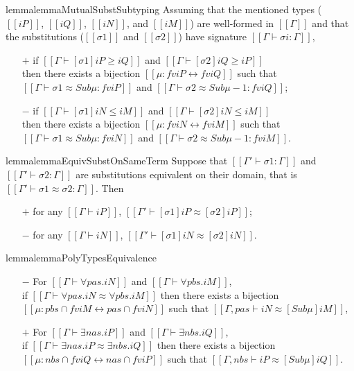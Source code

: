 \begin{restatable}{lemma}{lemmaMutualSubstSubtyping}
    \label{lemma:mutual-subst-subtyping}
    Assuming that the mentioned types ($[[iP]]$, $[[iQ]]$, $[[iN]]$, and $[[iM]]$)
    are well-formed in $[[Γ]]$ and that the substitutions ($[[σ1]]$ and $[[σ2]]$) have signature $[[Γ ⊢ σi : Γ]]$,
    \begin{itemize}
    \item[$+$] if $[[Γ ⊢ [σ1] iP ≥ iQ]]$ and $[[Γ ⊢ [σ2] iQ ≥ iP]]$\\
        then there exists a bijection $[[μ : fv iP ↔ fv iQ]]$ such that
        $[[Γ ⊢ σ1 ≈ Sub μ :  fv iP]]$ and $[[Γ ⊢ σ2 ≈ Sub μ-1 :  fv iQ]]$;
    \item[$-$] if $[[Γ ⊢ [σ1] iN ≤ iM]]$ and $[[Γ ⊢ [σ2] iN ≤ iM]]$\\
        then there exists a bijection $[[μ : fv iN ↔ fv iM]]$ such that
        $[[Γ ⊢ σ1 ≈ Sub μ :  fv iN]]$ and $[[Γ ⊢ σ2 ≈ Sub μ-1 :  fv iM]]$.
    \end{itemize}
\end{restatable}


\begin{restatable}{lemma}{lemmaEquivSubstOnSameTerm}
    \label{lemma:equiv-subst-on-same-term}
    Suppose that $[[Γ' ⊢ σ1 : Γ]]$ and $[[Γ' ⊢ σ2 : Γ]]$
    are substitutions equivalent on their domain, that is $[[Γ' ⊢ σ1 ≈ σ2 : Γ]]$.
    Then
    \begin{itemize}
        \item[$+$] for any $[[Γ ⊢ iP]]$, $[[Γ' ⊢ [σ1]iP ≈ [σ2]iP]]$;
        \item[$-$] for any $[[Γ ⊢ iN]]$, $[[Γ' ⊢ [σ1]iN ≈ [σ2]iN]]$.
    \end{itemize}
\end{restatable}


\begin{restatable}{lemma}{lemmaPolyTypesEquivalence}
    \label{lemma:poly-types-equivalence}
    \hfill
    \begin{itemize}
        \item[$-$] For $[[Γ ⊢ ∀pas.iN]]$ and $[[Γ ⊢ ∀pbs.iM]]$,\\ if $[[Γ ⊢ ∀pas.iN ≈ ∀pbs.iM ]]$
        then there exists a bijection $[[μ : {pbs} ∩ fv iM ↔ {pas} ∩ fv iN]]$
        such that $[[ Γ, pas ⊢ iN ≈ [Sub μ] iM ]]$,
        \item[$+$] For $[[Γ ⊢ ∃nas.iP]]$ and $[[Γ ⊢ ∃nbs.iQ]]$,\\  if $[[Γ ⊢ ∃nas.iP ≈ ∃nbs.iQ ]]$
        then there exists a bijection $[[μ : {nbs} ∩ fv iQ ↔ {nas} ∩ fv iP]]$
        such that $[[ Γ, nbs ⊢ iP ≈ [Sub μ] iQ ]]$.
    \end{itemize}
\end{restatable}


